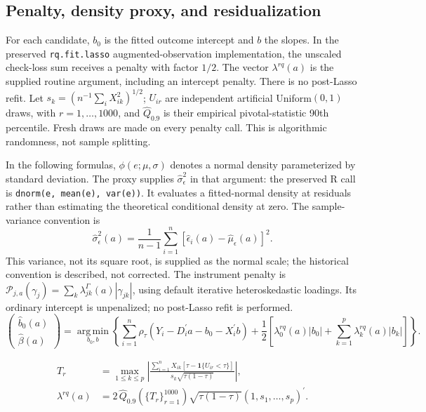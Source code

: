 \subsection{Penalty, density proxy, and residualization}
\label{app:penalty-implementation}
For each candidate, $b_0$ is the fitted outcome intercept and $b$ the slopes. In the preserved \texttt{rq.fit.lasso} augmented-observation implementation, the unscaled check-loss sum receives a penalty with factor $1/2$. The vector $\lambda^{rq}(a)$ is the supplied routine argument, including an intercept penalty. There is no post-Lasso refit. Let $s_k=(n^{-1}\sum_iX_{ik}^2)^{1/2}$; $U_{ir}$ are independent artificial Uniform$(0,1)$ draws, with $r=1,\ldots,1000$, and $\widehat Q_{0.9}$ is their empirical pivotal-statistic 90th percentile. Fresh draws are made on every penalty call. This is algorithmic randomness, not sample splitting.

In the following formulas, $\phi(e;\mu,\sigma)$ denotes a normal density parameterized by standard deviation. The proxy supplies $\widehat\sigma_\epsilon^2$ in that argument: the preserved R call is \texttt{dnorm(e, mean(e), var(e))}. It evaluates a fitted-normal density at residuals rather than estimating the theoretical conditional density at zero. The sample-variance convention is
\[
 \widehat\sigma_\epsilon^2(a)=\frac{1}{n-1}\sum_{i=1}^n
 \left[\widehat\epsilon_i(a)-\widehat\mu_\epsilon(a)\right]^2.
\]
This variance, not its square root, is supplied as the normal scale; the historical convention is described, not corrected. The instrument penalty is $\mathcal P_{j,a}(\gamma_j)=\sum_k\lambda^\Gamma_{jk}(a)|\gamma_{jk}|$, using default iterative heteroskedastic loadings. Its ordinary intercept is unpenalized; no post-Lasso refit is performed.
\begin{equation}
    \begin{pmatrix}
        \widehat b_0(a)\\
        \widehat\beta(a)
    \end{pmatrix}
    =
    \operatorname*{arg\,min}_{b_0,b}
    \left\{
        \sum_{i=1}^{n}
        \rho_{\tau}\!\left(
            Y_i-D_i^{\prime}a-b_0-X_i^{\prime}b
        \right)
        +
        \frac{1}{2}\left[
            \lambda_0^{rq}(a)|b_0|
            +\sum_{k=1}^{p}\lambda_k^{rq}(a)|b_k|
        \right]
    \right\}.
    \label{eq:beta-hat-dml}
\end{equation}

\begin{equation}
    \begin{aligned}
        T_r
        &=
        \max_{1\leq k\leq p}
        \left|
            \frac{
                \sum_{i=1}^{n}X_{ik}
                \left[\tau-\mathbf{1}\{U_{ir}<\tau\}\right]
            }{
                s_k\sqrt{\tau(1-\tau)}
            }
        \right|,\\
        \lambda^{rq}(a)
        &=
        2\,\widehat Q_{0.9}\!\left(\{T_r\}_{r=1}^{1000}\right)
        \sqrt{\tau(1-\tau)}
        (1,s_1,\ldots,s_p)^{\prime}.
    \end{aligned}
    \label{eq:bc-pivotal-penalty}
\end{equation}

